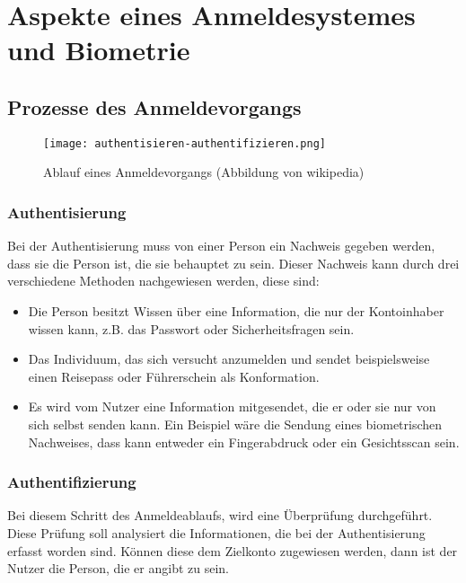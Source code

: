 \chapter{Aspekte eines Anmeldesystemes und Biometrie}
\strahlhofer

\section{Prozesse des Anmeldevorgangs}
\begin{center}
\begin{figure}[h]
    \centering
    \texttt{[image: authentisieren-authentifizieren.png]}
    \caption{Ablauf eines Anmeldevorgangs (Abbildung von wikipedia)}
\end{figure}
\end{center}

\subsection{Authentisierung}
Bei der Authentisierung muss von einer Person ein Nachweis gegeben werden, dass sie die Person ist, die sie behauptet zu sein. Dieser Nachweis kann durch drei verschiedene Methoden nachgewiesen werden, diese sind:
\begin{itemize}
	\item Die Person besitzt Wissen über eine Information, die nur der Kontoinhaber wissen kann, z.B. das Passwort oder Sicherheitsfragen sein.
	\item Das Individuum, das sich versucht anzumelden und sendet beispielsweise einen Reisepass oder Führerschein als Konformation.
	\item Es wird vom Nutzer eine Information mitgesendet, die er oder sie nur von sich selbst senden kann. Ein Beispiel wäre die Sendung eines biometrischen Nachweises, dass kann entweder ein Fingerabdruck oder ein Gesichtsscan sein.
\end{itemize}

\subsection{Authentifizierung}
Bei diesem Schritt des Anmeldeablaufs, wird eine Überprüfung durchgeführt. Diese Prüfung soll analysiert die Informationen, die bei der Authentisierung erfasst worden sind. Können diese dem Zielkonto zugewiesen werden, dann ist der Nutzer die Person, die er angibt zu sein.

